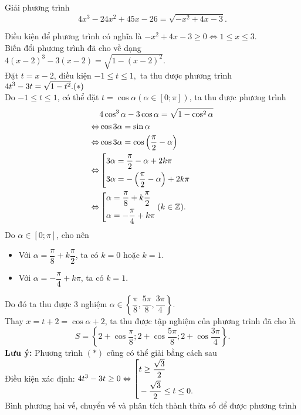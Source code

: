 \begin{bt}%
	Giải phương trình $$4x^3-24x^2+45x-26=\sqrt{-x^2+4x-3}.$$
	\loigiai
	{Điều kiện để phương trình có nghĩa là $-x^2+4x-3 \geq 0 \Leftrightarrow 1\leq x \leq 3$.\\
		Biến đổi phương trình đã cho về dạng $ 4(x-2)^3-3(x-2)= \sqrt{1-(x-2)^2}.$\\
		Đặt $t=x-2$, điều kiện $-1 \leq t \leq 1,$ ta thu được phương trình $ 4t^3-3t = \sqrt{1-t^2}.\hfill (*)$\\
		Do $-1 \leq t \leq 1$, có thể đặt $t= \cos \alpha \left( \alpha \in [0;\pi]\right)$, ta thu được phương trình
		{\allowdisplaybreaks 
		\begin{align*}
			&4\cos^3 \alpha -3 \cos \alpha =\sqrt{1-\cos^2\alpha} \\
			\Leftrightarrow& \cos 3\alpha = \sin \alpha\\
			\Leftrightarrow& \cos 3\alpha =\cos \left( \dfrac{\pi}{2}- \alpha \right)\\
			\Leftrightarrow& \left[\begin{aligned}& 3\alpha = \dfrac{\pi}{2}- \alpha +2k \pi\\& 3\alpha =- \left(\dfrac{\pi}{2}- \alpha \right)+2k \pi\end{aligned}\right.\\
			\Leftrightarrow& \left[\begin{aligned}& \alpha = \dfrac{\pi}{8}+k\dfrac{\pi}{2}\\& \alpha = -\dfrac{\pi}{4}+k\pi\end{aligned}\right. (k\in \mathbb{Z}).
		\end{align*}}Do $\alpha \in [0;\pi]$, cho nên 
		\begin{itemize}
			\item Với $\alpha = \dfrac{\pi}{8}+k\dfrac{\pi}{2}$, ta có $k=0$ hoặc $k=1$.
			\item Với $\alpha = -\dfrac{\pi}{4}+k\pi$, ta có $k=1$.
		\end{itemize}
		Do đó ta thu được $3$ nghiệm $\alpha \in \left\{ \dfrac{\pi}{8}, \dfrac{5\pi}{8}, \dfrac{3\pi}{4} \right\}.$\\
		Thay $x=t+2= \cos \alpha +2$, ta thu được tập nghiệm của phương trình đã cho là $$S= \left \{2+ \cos \dfrac{\pi}{8}; 2+ \cos \dfrac{5\pi}{8} ; 2+ \cos \dfrac{3\pi}{4} \right\}.$$
		{\bf {Lưu ý:}}
		Phương trình $(*)$ cũng có thể giải bằng cách sau\\
		Điều kiện xác định: $4t^3-3t \geq 0 \Leftrightarrow \left[\begin{aligned}&t\geq \dfrac{\sqrt{3}}{2}\\& -\dfrac{\sqrt{3}}{2}\leq t\leq 0.\end{aligned}\right.$\\
		Bình phương hai vế, chuyển vế và phân tích thành thừa số để được phương trình
}
\end{bt}
